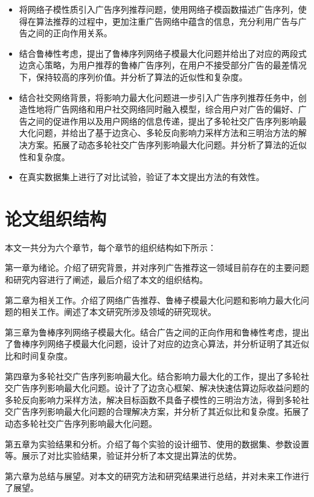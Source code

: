 \begin{itemize}
\item 将网络子模性质引入广告序列推荐问题，使用网络子模函数描述广告序列，使得在算法推荐的过程中，更加注重广告网络中蕴含的信息，充分利用广告与广告之间的正向作用关系。
\item 结合鲁棒性考虑，提出了鲁棒序列网络子模最大化问题并给出了对应的两段式边贪心策略，为用户推荐的鲁棒广告序列，在用户不接受部分广告的最差情况下，保持较高的序列价值。并分析了算法的近似性和复杂度。
\item 结合社交网络背景，将影响力最大化问题进一步引入广告序列推荐任务中，创造性地将广告网络和用户社交网络同时融入模型，综合用户对广告的偏好、广告之间的促进作用以及用户网络的信息传递，提出了多轮社交广告序列影响最大化问题，并给出了基于边贪心、多轮反向影响力采样方法和三明治方法的解决方案。拓展了动态多轮社交广告序列影响最大化问题。并分析了算法的近似性和复杂度。
\item 在真实数据集上进行了对比试验，验证了本文提出方法的有效性。
\end{itemize}


\section{论文组织结构}

本文一共分为六个章节，每个章节的组织结构如下所示：

第一章为绪论。介绍了研究背景，并对序列广告推荐这一领域目前存在的主要问题和研究内容进行了阐述，最后介绍了本文的组织结构。

第二章为相关工作。介绍了网络广告推荐、鲁棒子模最大化问题和影响力最大化问题的相关工作。阐述了本文研究所涉及领域的研究现状。

第三章为鲁棒序列网络子模最大化。结合广告之间的正向作用和鲁棒性考虑，提出了鲁棒序列网络子模最大化问题，设计了对应的边贪心算法，并分析证明了其近似比和时间复杂度。

第四章为多轮社交广告序列影响最大化。结合影响力最大化的工作，提出了多轮社交广告序列影响最大化问题。设计了了边贪心框架、解决快速估算边际收益问题的多轮反向影响力采样方法，解决目标函数不具备子模性的三明治方法，得到多轮社交广告序列影响最大化问题的合理解决方案，并分析了其近似比和复杂度。拓展了动态多轮社交广告序列影响最大化问题。

第五章为实验结果和分析。介绍了每个实验的设计细节、使用的数据集、参数设置等。展示了对比实验结果，验证并分析了本文提出算法的优势。

第六章为总结与展望。对本文的研究方法和研究结果进行总结，并对未来工作进行了展望。

